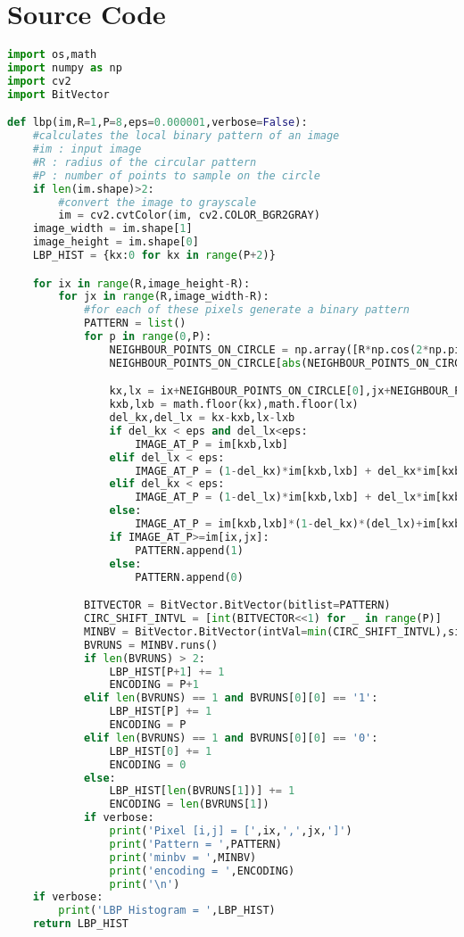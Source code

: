 \documentclass{article}
\begin{document}
\section{Source Code}
\begin{lstlisting}[language=Python]
import os,math
import numpy as np
import cv2
import BitVector

def lbp(im,R=1,P=8,eps=0.000001,verbose=False):
	#calculates the local binary pattern of an image
	#im : input image
	#R : radius of the circular pattern
	#P : number of points to sample on the circle
	if len(im.shape)>2:
		#convert the image to grayscale
		im = cv2.cvtColor(im, cv2.COLOR_BGR2GRAY)
	image_width = im.shape[1]
	image_height = im.shape[0]
	LBP_HIST = {kx:0 for kx in range(P+2)}

	for ix in range(R,image_height-R):
		for jx in range(R,image_width-R):
			#for each of these pixels generate a binary pattern
			PATTERN = list()
			for p in range(0,P):
				NEIGHBOUR_POINTS_ON_CIRCLE = np.array([R*np.cos(2*np.pi*p/P),R*np.sin(2*np.pi*p/P)])
				NEIGHBOUR_POINTS_ON_CIRCLE[abs(NEIGHBOUR_POINTS_ON_CIRCLE)<eps] = 0

				kx,lx = ix+NEIGHBOUR_POINTS_ON_CIRCLE[0],jx+NEIGHBOUR_POINTS_ON_CIRCLE[1]
				kxb,lxb = math.floor(kx),math.floor(lx)
				del_kx,del_lx = kx-kxb,lx-lxb
				if del_kx < eps and del_lx<eps:
					IMAGE_AT_P = im[kxb,lxb]
				elif del_lx < eps:
					IMAGE_AT_P = (1-del_kx)*im[kxb,lxb] + del_kx*im[kxb+1,lxb]
				elif del_kx < eps:
					IMAGE_AT_P = (1-del_lx)*im[kxb,lxb] + del_lx*im[kxb,lxb+1]
				else:
					IMAGE_AT_P = im[kxb,lxb]*(1-del_kx)*(del_lx)+im[kxb,lxb+1]*del_lx*(1-del_kx)+im[kxb+1,lxb]*del_kx*(1-del_lx)+im[kxb+1,lxb+1]*del_kx*del_lx;
				if IMAGE_AT_P>=im[ix,jx]:
					PATTERN.append(1)
				else:
					PATTERN.append(0)

			BITVECTOR = BitVector.BitVector(bitlist=PATTERN)
			CIRC_SHIFT_INTVL = [int(BITVECTOR<<1) for _ in range(P)]
			MINBV = BitVector.BitVector(intVal=min(CIRC_SHIFT_INTVL),size=P)
			BVRUNS = MINBV.runs()
			if len(BVRUNS) > 2:
				LBP_HIST[P+1] += 1
				ENCODING = P+1
			elif len(BVRUNS) == 1 and BVRUNS[0][0] == '1':
				LBP_HIST[P] += 1
				ENCODING = P
			elif len(BVRUNS) == 1 and BVRUNS[0][0] == '0':
				LBP_HIST[0] += 1
				ENCODING = 0
			else:
				LBP_HIST[len(BVRUNS[1])] += 1
				ENCODING = len(BVRUNS[1])
			if verbose:
				print('Pixel [i,j] = [',ix,',',jx,']')
				print('Pattern = ',PATTERN)
				print('minbv = ',MINBV)
				print('encoding = ',ENCODING)
				print('\n')
	if verbose:
		print('LBP Histogram = ',LBP_HIST)
	return LBP_HIST


\end{lstlisting}
\end{document}
